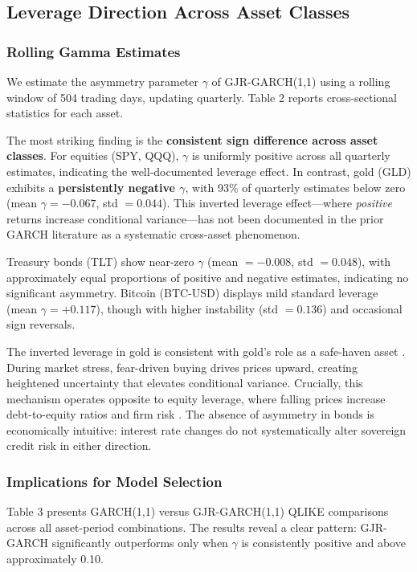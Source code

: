 \subsection{Leverage Direction Across Asset Classes}

\subsubsection{Rolling Gamma Estimates}

We estimate the asymmetry parameter $\gamma$ of GJR-GARCH(1,1) using a rolling window of 504 trading days, updating quarterly. Table 2 reports cross-sectional statistics for each asset.

The most striking finding is the \textbf{consistent sign difference across asset classes}. For equities (SPY, QQQ), $\gamma$ is uniformly positive across all quarterly estimates, indicating the well-documented leverage effect. In contrast, gold (GLD) exhibits a \textbf{persistently negative $\gamma$}, with 93\% of quarterly estimates below zero (mean $\gamma = -0.067$, std $= 0.044$). This inverted leverage effect---where \textit{positive} returns increase conditional variance---has not been documented in the prior GARCH literature as a systematic cross-asset phenomenon.

Treasury bonds (TLT) show near-zero $\gamma$ (mean $= -0.008$, std $= 0.048$), with approximately equal proportions of positive and negative estimates, indicating no significant asymmetry. Bitcoin (BTC-USD) displays mild standard leverage (mean $\gamma = +0.117$), though with higher instability (std $= 0.136$) and occasional sign reversals.

The inverted leverage in gold is consistent with gold's role as a safe-haven asset \citep{baur2010safe,baur2010hedge}. During market stress, fear-driven buying drives prices upward, creating heightened uncertainty that elevates conditional variance. Crucially, this mechanism operates opposite to equity leverage, where falling prices increase debt-to-equity ratios and firm risk \citep{black1976,christie1982}. The absence of asymmetry in bonds is economically intuitive: interest rate changes do not systematically alter sovereign credit risk in either direction.

\subsubsection{Implications for Model Selection}

Table 3 presents GARCH(1,1) versus GJR-GARCH(1,1) QLIKE comparisons across all asset-period combinations. The results reveal a clear pattern: GJR-GARCH significantly outperforms only when $\gamma$ is consistently positive and above approximately 0.10.

